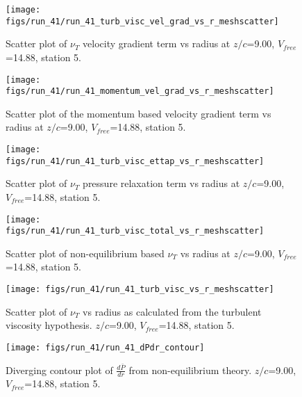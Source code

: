 \begin{figure}[H]
\centering
\texttt{[image: figs/run\_41/run\_41\_turb\_visc\_vel\_grad\_vs\_r\_meshscatter]}
\caption{Scatter plot of $\nu_T$ velocity gradient term vs radius at $z/c$=9.00, $V_{free}$=14.88, station 5.}
\end{figure}


\begin{figure}[H]
\centering
\texttt{[image: figs/run\_41/run\_41\_momentum\_vel\_grad\_vs\_r\_meshscatter]}
\caption{Scatter plot of the momentum based velocity gradient term vs radius at $z/c$=9.00, $V_{free}$=14.88, station 5.}
\end{figure}


\begin{figure}[H]
\centering
\texttt{[image: figs/run\_41/run\_41\_turb\_visc\_ettap\_vs\_r\_meshscatter]}
\caption{Scatter plot of $\nu_T$ pressure relaxation term vs radius at $z/c$=9.00, $V_{free}$=14.88, station 5.}
\end{figure}


\begin{figure}[H]
\centering
\texttt{[image: figs/run\_41/run\_41\_turb\_visc\_total\_vs\_r\_meshscatter]}
\caption{Scatter plot of non-equilibrium based $\nu_T$ vs radius at $z/c$=9.00, $V_{free}$=14.88, station 5.}
\end{figure}


\begin{figure}[H]
\centering
\texttt{[image: figs/run\_41/run\_41\_turb\_visc\_vs\_r\_meshscatter]}
\caption{Scatter plot of $\nu_T$ vs radius as calculated from the turbulent viscosity hypothesis. $z/c$=9.00, $V_{free}$=14.88, station 5.}
\end{figure}


\begin{figure}[H]
\centering
\texttt{[image: figs/run\_41/run\_41\_dPdr\_contour]}
\caption{Diverging contour plot of $\frac{d\bar{P}}{dr}$ from non-equilibrium theory. $z/c$=9.00, $V_{free}$=14.88, station 5.}
\end{figure}


